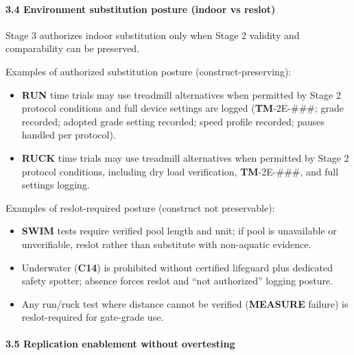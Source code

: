 \documentclass[10pt]{article}
\begin{document}
\paragraph*{3.4 Environment substitution posture (indoor vs reslot)}

Stage 3 authorizes indoor substitution only when Stage 2 validity and comparability can be preserved.

Examples of authorized substitution posture (construct-preserving):

\begin{itemize}
\item \textbf{RUN} time trials may use treadmill alternatives when permitted by Stage 2 protocol conditions and full device settings are logged (\textbf{TM}-2E-###; grade recorded; adopted grade setting recorded; speed profile recorded; pauses handled per protocol).
\item \textbf{RUCK} time trials may use treadmill alternatives when permitted by Stage 2 protocol conditions, including dry load verification, \textbf{TM}-2E-###, and full settings logging.
\end{itemize}

Examples of reslot-required posture (construct not preservable):

\begin{itemize}
\item \textbf{SWIM} tests require verified pool length and unit; if pool is unavailable or unverifiable, reslot rather than substitute with non-aquatic evidence.
\item Underwater (\textbf{C14}) is prohibited without certified lifeguard plus dedicated safety spotter; absence forces reslot and “not authorized” logging posture.
\item Any run/ruck test where distance cannot be verified (\textbf{MEASURE} failure) is reslot-required for gate-grade use.
\end{itemize}

\paragraph*{3.5 Replication enablement without overtesting}
\end{document}
